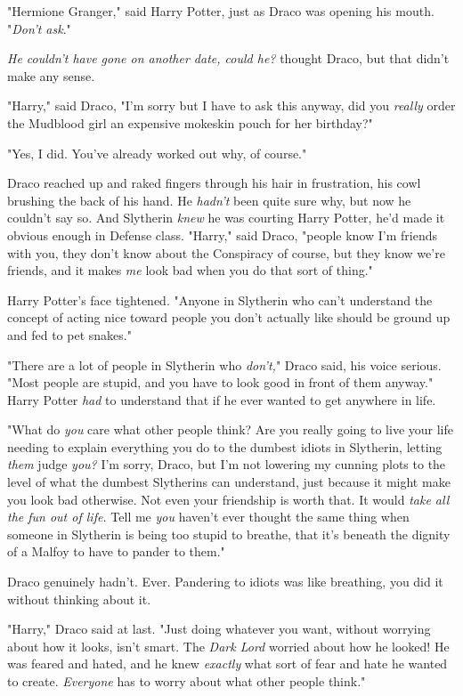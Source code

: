 "Hermione Granger," said Harry Potter, just as Draco was opening his mouth.
"\emph{Don't ask}."

\emph{He couldn't have gone on another date, could he?} thought Draco, but that
didn't make any sense.

"Harry," said Draco, "I'm sorry but I have to ask this anyway, did you
\emph{really} order the Mudblood girl an expensive mokeskin pouch for her
birthday?"

"Yes, I did. You've already worked out why, of course."

Draco reached up and raked fingers through his hair in frustration, his cowl
brushing the back of his hand. He \emph{hadn't} been quite sure why, but now he
couldn't say so. And Slytherin \emph{knew} he was courting Harry Potter, he'd
made it obvious enough in Defense class. "Harry," said Draco, "people know I'm
friends with you, they don't know about the Conspiracy of course, but they know
we're friends, and it makes \emph{me} look bad when you do that sort of thing."

Harry Potter's face tightened. "Anyone in Slytherin who can't understand the
concept of acting nice toward people you don't actually like should be ground
up and fed to pet snakes."

"There are a lot of people in Slytherin who \emph{don't,}" Draco said, his
voice serious. "Most people are stupid, and you have to look good in front of
them anyway." Harry Potter \emph{had} to understand that if he ever wanted to
get anywhere in life.

"What do \emph{you} care what other people think? Are you really going to live
your life needing to explain everything you do to the dumbest idiots in
Slytherin, letting \emph{them} judge \emph{you?} I'm sorry, Draco, but I'm not
lowering my cunning plots to the level of what the dumbest Slytherins can
understand, just because it might make you look bad otherwise. Not even your
friendship is worth that. It would \emph{take all the fun out of life.} Tell me
\emph{you} haven't ever thought the same thing when someone in Slytherin is
being too stupid to breathe, that it's beneath the dignity of a Malfoy to have
to pander to them."

Draco genuinely hadn't. Ever. Pandering to idiots was like breathing, you did
it without thinking about it.

"Harry," Draco said at last. "Just doing whatever you want, without worrying
about how it looks, isn't smart. The \emph{Dark Lord} worried about how he
looked! He was feared and hated, and he knew \emph{exactly} what sort of fear
and hate he wanted to create. \emph{Everyone} has to worry about what other
people think."


